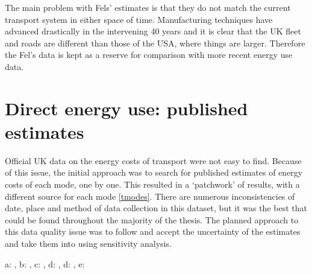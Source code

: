 The main problem with Fels' estimates is that they do not match the current
transport system in either space of time. Manufacturing techniques have
advanced drastically in the intervening 40 years and it is clear that the UK
fleet and roads are different than those of the USA, where things are larger.
Therefore the Fel's data is kept as a reserve for comparison with more recent
energy use data.

\section{Direct energy use: published estimates} \label{sdirecte}
Official UK data on the energy costs of transport were not easy to find.
Because of this issue, the initial approach was to search for published
estimates of energy costs of each mode, one by one. This resulted in a
`patchwork' of results, with a different source for each mode \cref{tmodes}.
There are numerous inconsistencies of date, place and method of data collection
in this dataset, but it was the best that could be found throughout the
majority of the thesis. The planned approach to this data quality issue was to
follow \citet{Lovelace2011-assessing} and accept the uncertainty of the estimates and
take them into using sensitivity analysis. %

\begin{table}[t]
\caption{Direct energy use of selected modes}
\label{tmodes}
\begin{footnotesize}

\vspace{1cm}
 a: \citep{Coley2002}, b: \citep{Hansard2005}, c:
\citep{MacKay2009}, d: \citep{DfT2011-commuting}, d:
\citep{LondonUnderground2007}, e: \citep{ORNL2011}
\end{footnotesize} %
\end{table}


